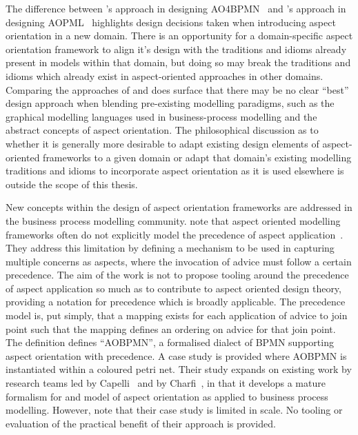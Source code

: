 The difference between \citeauthor{charfi2010AO4BPMN}'s approach in designing
AO4BPMN~\cite{charfi2010AO4BPMN} and \citeauthor{Cappelli_AOBPM}'s approach in
designing AOPML~\cite{Cappelli_AOBPM} highlights design decisions taken when
introducing aspect orientation in a new domain. There is an opportunity for a
domain-specific aspect orientation framework to align it's design with the
traditions and idioms already present in models within that domain, but doing so
may break the traditions and idioms which already exist in aspect-oriented
approaches in other domains.  Comparing the approaches of
\citeauthor{charfi2010AO4BPMN} and \citeauthor{Cappelli_AOBPM} does surface that
there may be no clear ``best'' design approach when blending pre-existing
modelling paradigms, such as the graphical modelling languages used in
business-process modelling and the abstract concepts of aspect orientation. The
philosophical discussion as to whether it is generally more desirable to adapt
existing design elements of aspect-oriented frameworks to a given domain or
adapt that domain's existing modelling traditions and idioms to incorporate
aspect orientation as it is used elsewhere is outside the scope of this thesis.

New concepts within the design of aspect orientation frameworks are addressed in
the business process modelling community.  note
that aspect oriented modelling frameworks often do not explicitly model the
precedence of aspect application~\cite{jalali2012aspect}. They address this
limitation by defining a mechanism to be used in capturing multiple concerns as
aspects, where the invocation of advice must follow a certain precedence. The
aim of the work is not to propose tooling around the precedence of aspect
application so much as to contribute to aspect oriented design theory, providing
a notation for precedence which is broadly applicable. The precedence model is,
put simply, that a mapping exists for each application of advice to join point
such that the mapping defines an ordering on advice for that join point. The
definition defines ``AOBPMN'', a formalised dialect of BPMN supporting aspect
orientation with precedence. A case study is provided where AOBPMN is
instantiated within a coloured petri net. Their study expands on existing work
by research teams led by Capelli~\cite{Cappelli_AOBPM,da2020implementation} and
by Charfi~\cite{charfi2007ao4bpel}, in that it develops a mature formalism for
and model of aspect orientation as applied to business process modelling.
However, \citeauthor{jalali2012aspect} note that their case study is limited in
scale. No tooling or evaluation of the practical benefit of their approach is
provided.


